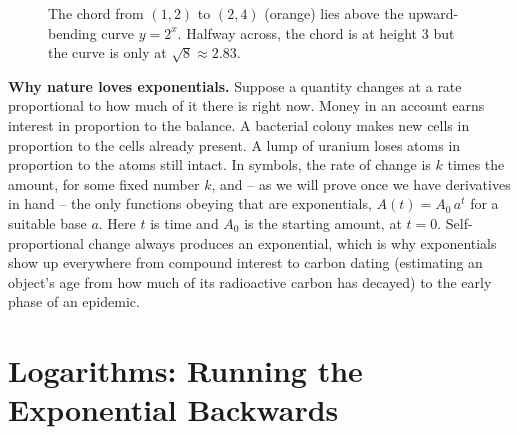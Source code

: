 \begin{figure}[htbp]
\centering
{}
\caption{The chord from $(1,2)$ to $(2,4)$ (orange) lies above the upward-bending curve $y=2^x$. Halfway across, the chord is at height $3$ but the curve is only at $\sqrt8\approx 2.83$.}
\label{ch03:fig-chord}
\end{figure}

\begin{applicationbox}
\textbf{Why nature loves exponentials.} Suppose a quantity changes at a rate proportional to how much of it there is right now. Money in an account earns interest in proportion to the balance. A bacterial colony makes new cells in proportion to the cells already present. A lump of uranium loses atoms in proportion to the atoms still intact. In symbols, the rate of change is $k$ times the amount, for some fixed number $k$, and -- as we will prove once we have derivatives in hand -- the only functions obeying that are exponentials, $A(t)=A_0\, a^{t}$ for a suitable base $a$. Here $t$ is time and $A_0$ is the starting amount, at $t=0$. Self-proportional change always produces an exponential, which is why exponentials show up everywhere from compound interest to carbon dating (estimating an object's age from how much of its radioactive carbon has decayed) to the early phase of an epidemic.
\end{applicationbox}

\section{Logarithms: Running the Exponential Backwards}

